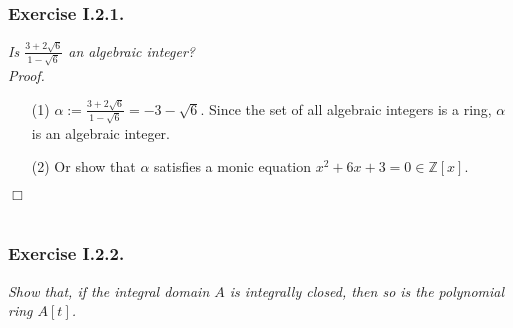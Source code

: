 \documentclass{article}
\begin{document}
\subsubsection*{Exercise I.2.1.}
\emph{Is $\frac{3+2\sqrt{6}}{1-\sqrt{6}}$ an algebraic integer?} \\



\emph{Proof.}
\begin{enumerate}
\item[(1)]
  $\alpha := \frac{3+2\sqrt{6}}{1-\sqrt{6}} = -3-\sqrt{6}$.
  Since the set of all algebraic integers is a ring,
  $\alpha$ is an algebraic integer.

\item[(2)]
  Or show that $\alpha$ satisfies a monic equation $x^2 + 6x + 3 = 0 \in \mathbb{Z}[x]$.
\end{enumerate}
$\Box$ \\\\






\subsubsection*{Exercise I.2.2.}
\emph{Show that, if the integral domain $A$ is integrally closed,
then so is the polynomial ring $A[t]$.} \\
\end{document}
